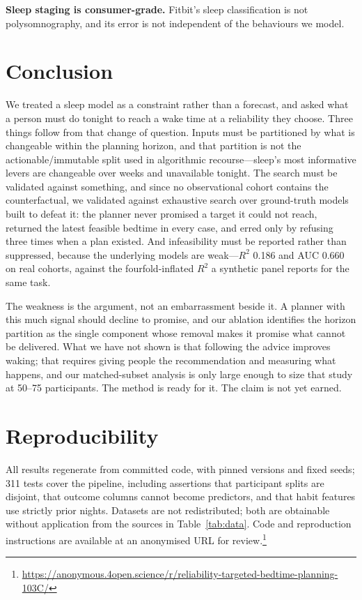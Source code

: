 \documentclass[conference]{IEEEtran}
\begin{document}
\textbf{Sleep staging is consumer-grade.} Fitbit's sleep classification is not
polysomnography, and its error is not independent of the behaviours we model.

\section{Conclusion}
\label{sec:conclusion}

We treated a sleep model as a constraint rather than a forecast, and asked what
a person must do tonight to reach a wake time at a reliability they choose.
Three things follow from that change of question. Inputs must be partitioned by
what is changeable within the planning horizon, and that partition is not the
actionable/immutable split used in algorithmic recourse---sleep's most
informative levers are changeable over weeks and unavailable tonight. The search
must be validated against something, and since no observational cohort contains
the counterfactual, we validated against exhaustive search over ground-truth
models built to defeat it: the planner never promised a target it could not
reach, returned the latest feasible bedtime in every case, and erred only by
refusing three times when a plan existed. And infeasibility must be reported
rather than suppressed, because the underlying models are weak---$R^2$ 0.186 and
AUC 0.660 on real cohorts, against the fourfold-inflated $R^2$ a synthetic panel
reports for the same task.

The weakness is the argument, not an embarrassment beside it. A planner with
this much signal should decline to promise, and our ablation identifies the
horizon partition as the single component whose removal makes it promise what
cannot be delivered. What we have not shown is that following the advice
improves waking; that requires giving people the recommendation and measuring
what happens, and our matched-subset analysis is only large enough to size that
study at 50--75 participants. The method is ready for it. The claim is not yet
earned.

\section*{Reproducibility}

All results regenerate from committed code, with pinned versions and fixed
seeds; 311 tests cover the pipeline, including assertions that participant
splits are disjoint, that outcome columns cannot become predictors, and that
habit features use strictly prior nights. Datasets are not redistributed; both
are obtainable without application from the sources in
Table~\ref{tab:data}. Code and reproduction instructions are available at an
anonymised URL for review.\footnote{%
\url{https://anonymous.4open.science/r/reliability-targeted-bedtime-planning-103C/}}
\end{document}
